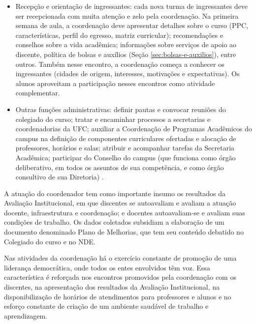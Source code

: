\begin{itemize}
    \item Recepção e orientação de ingressantes: cada nova turma de ingressantes deve ser recepcionada com muita atenção e zelo pela coordenação. Na primeira semana de aula, a coordenação deve apresentar detalhes sobre o curso (PPC, características, perfil do egresso, matriz curricular); recomendações e conselhos sobre a vida acadêmica; informações sobre serviços de apoio ao discente, política de bolsas e auxílios (Seção \ref{sec:bolsas-e-auxilios}), entre outros. Também nesse encontro, a coordenação começa a conhecer os ingressantes (cidades de origem, interesses, motivações e expectativas). Os alunos aproveitam a participação nesses encontros como atividade complementar.


    \item Outras funções administrativas: definir pautas e convocar reuniões do colegiado do curso; tratar e encaminhar processos a secretarias e coordenadorias da UFC; auxiliar a Coordenação de Programas Acadêmicos do campus na definição de componentes curriculares ofertadas e alocação de professores, horários e salas; atribuir e acompanhar tarefas da Secretaria Acadêmica; participar do Conselho do campus (que funciona como órgão deliberativo, em todos os assuntos de sua competência, e como órgão consultivo de sua Diretoria) \cite{ufc_regimento_geral_2019}.
\end{itemize}

A atuação do coordenador tem como importante insumo os resultados da Avaliação Institucional, em que discentes se autoavaliam e avaliam a atuação docente, infraestrutura e coordenação; e docentes autoavaliam-se e avaliam suas condições de trabalho. Os dados coletados subsidiam a elaboração de um documento denominado Plano de Melhorias, que tem seu conteúdo debatido no Colegiado do curso e no NDE.

Nas atividades da coordenação há o exercício constante de promoção de uma liderança democrática, onde todos os entes envolvidos têm voz. Essa característica é reforçada nos encontros promovidos pela coordenação com os discentes, na apresentação dos resultados da Avaliação Institucional, na disponibilização de horários de atendimentos para professores e alunos e no esforço constante de criação de um ambiente saudável de trabalho e aprendizagem.

